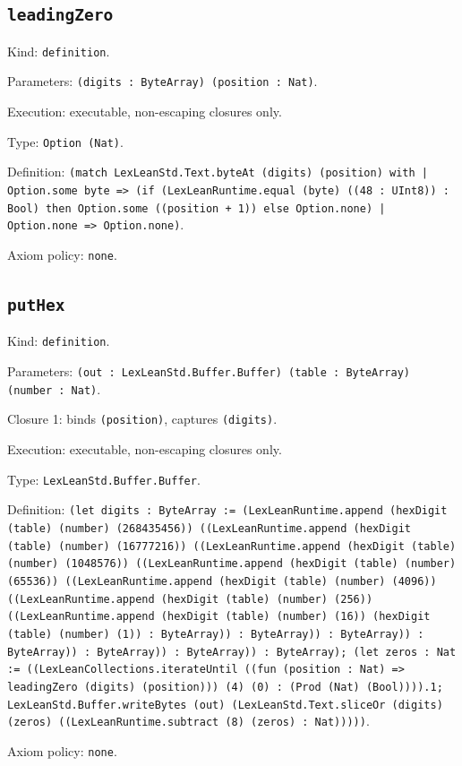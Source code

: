 \documentclass[11pt]{article}
\begin{document}
\subsection*{\texttt{leadingZero}}
\noindent Kind: \texttt{definition}.\par
\noindent Parameters: \texttt{(digits : ByteArray) (position : Nat)}.\par
\noindent Execution: executable, non-escaping closures only.\par
\noindent Type: \texttt{Option (Nat)}.\par
\noindent Definition: \texttt{(match LexLeanStd.Text.byteAt (digits) (position) with | Option.some byte => (if (LexLeanRuntime.equal (byte) ((48 : UInt8)) : Bool) then Option.some ((position + 1)) else Option.none) | Option.none => Option.none)}.\par
\noindent Axiom policy: \texttt{none}.\par
\subsection*{\texttt{putHex}}
\noindent Kind: \texttt{definition}.\par
\noindent Parameters: \texttt{(out : LexLeanStd.Buffer.Buffer) (table : ByteArray) (number : Nat)}.\par
\noindent Closure 1: binds \texttt{(position)}, captures \texttt{(digits)}.\par
\noindent Execution: executable, non-escaping closures only.\par
\noindent Type: \texttt{LexLeanStd.Buffer.Buffer}.\par
\noindent Definition: \texttt{(let digits : ByteArray := (LexLeanRuntime.append (hexDigit (table) (number) (268435456)) ((LexLeanRuntime.append (hexDigit (table) (number) (16777216)) ((LexLeanRuntime.append (hexDigit (table) (number) (1048576)) ((LexLeanRuntime.append (hexDigit (table) (number) (65536)) ((LexLeanRuntime.append (hexDigit (table) (number) (4096)) ((LexLeanRuntime.append (hexDigit (table) (number) (256)) ((LexLeanRuntime.append (hexDigit (table) (number) (16)) (hexDigit (table) (number) (1)) : ByteArray)) : ByteArray)) : ByteArray)) : ByteArray)) : ByteArray)) : ByteArray)) : ByteArray); (let zeros : Nat := ((LexLeanCollections.iterateUntil ((fun (position : Nat) => leadingZero (digits) (position))) (4) (0) : (Prod (Nat) (Bool)))).1; LexLeanStd.Buffer.writeBytes (out) (LexLeanStd.Text.sliceOr (digits) (zeros) ((LexLeanRuntime.subtract (8) (zeros) : Nat)))))}.\par
\noindent Axiom policy: \texttt{none}.\par
\end{document}
